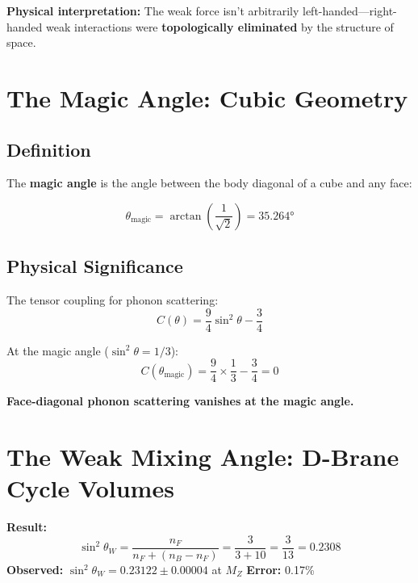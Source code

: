 \documentclass[12pt,a4paper]{article}
\newcommand{\sinW}{\sin^2\theta_W}
\newcommand{\nB}{n_B}
\newcommand{\nF}{n_F}
\begin{document}
\textbf{Physical interpretation:} The weak force isn't arbitrarily left-handed---right-handed weak interactions were \textbf{topologically eliminated} by the structure of space.

\section{The Magic Angle: Cubic Geometry}
\label{sec:magic}

\subsection{Definition}

The \textbf{magic angle} is the angle between the body diagonal of a cube and any face:

\begin{equation}
\boxed{\theta_{\text{magic}} = \arctan\left(\frac{1}{\sqrt{2}}\right) = 35.264°}
\end{equation}

\subsection{Physical Significance}

The tensor coupling for phonon scattering:
\begin{equation}
C(\theta) = \frac{9}{4}\sin^2\theta - \frac{3}{4}
\end{equation}

At the magic angle ($\sin^2\theta = 1/3$):
\begin{equation}
C(\theta_{\text{magic}}) = \frac{9}{4} \times \frac{1}{3} - \frac{3}{4} = 0
\end{equation}

\textbf{Face-diagonal phonon scattering vanishes at the magic angle.}

\section{The Weak Mixing Angle: D-Brane Cycle Volumes}
\label{sec:weinberg}

\begin{derivedbox}
\textbf{Result:}
\begin{equation}
\sinW = \frac{\nF}{\nF + (\nB - \nF)} = \frac{3}{3 + 10} = \frac{3}{13} = 0.2308
\end{equation}
\textbf{Observed:} $\sinW = 0.23122 \pm 0.00004$ at $M_Z$ \quad \textbf{Error:} 0.17\%
\end{derivedbox}
\end{document}

